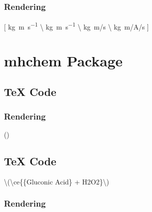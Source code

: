 \documentclass{book}
\newenvironment{Shaded}{}{}
\newcommand{\SpecialCharTok}[1]{\textcolor[rgb]{0.25,0.44,0.63}{#1}}
\newcommand{\SpecialStringTok}[1]{\textcolor[rgb]{0.73,0.40,0.53}{#1}}
\begin{document}
\hypertarget{rendering-1}{%
\subsection{Rendering}\label{rendering-1}}

{[} \si{kg.m.s^{-1}} \textbackslash{} \si{\kilogram\metre\per\second}
\textbackslash{} \si[per-mode=symbol]     {\kilogram\metre\per\second}
\textbackslash{}
\si[per-mode=symbol]     {\kilogram\metre\per\ampere\per\second} {]}

\hypertarget{mhchem-package}{%
\chapter{mhchem Package}\label{mhchem-package}}

\hypertarget{tex-code-2}{%
\section{TeX Code}\label{tex-code-2}}

\begin{Shaded}
\end{Shaded}

\hypertarget{rendering-2}{%
\subsection{Rendering}\label{rendering-2}}

()

\hypertarget{tex-code-3}{%
\section{TeX Code}\label{tex-code-3}}

\begin{Shaded}
\begin{Highlighting}[]
\SpecialStringTok{\textbackslash{}(}\SpecialCharTok{\textbackslash{}ce}\SpecialStringTok{\{\{Gluconic Acid\} + H2O2\}\textbackslash{})}
\end{Highlighting}
\end{Shaded}

\hypertarget{rendering-3}{%
\subsection{Rendering}\label{rendering-3}}
\end{document}
